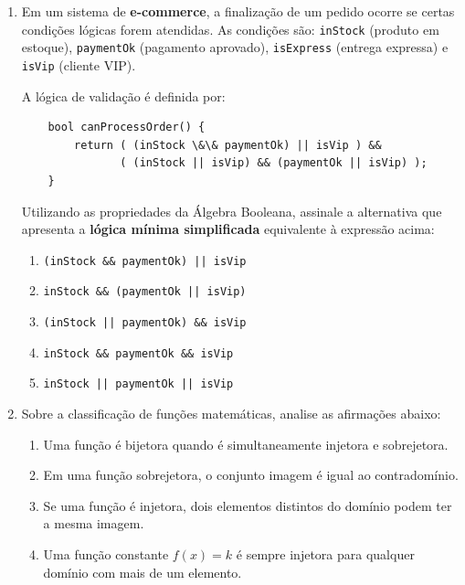 \documentclass[12pt,a4paper]{article}
\begin{document}
\begin{enumerate}
    \item Em um sistema de \textbf{e-commerce}, a finalização de um pedido ocorre se certas condições lógicas forem atendidas.
    As condições são: \texttt{inStock} (produto em estoque), \texttt{paymentOk} (pagamento aprovado), \texttt{isExpress} (entrega expressa) e \texttt{isVip} (cliente VIP).
    
    A lógica de validação é definida por:
    
    \begin{codeblock}
    \begin{verbatim}
    bool canProcessOrder() {
        return ( (inStock \&\& paymentOk) || isVip ) &&
               ( (inStock || isVip) && (paymentOk || isVip) );
    }
    \end{verbatim}
    \end{codeblock}

    Utilizando as propriedades da Álgebra Booleana, assinale a alternativa que apresenta a \textbf{lógica mínima simplificada} equivalente à expressão acima:

    \begin{enumerate}[label=\Alph*)]
        \item \texttt{(inStock \&\& paymentOk) || isVip}
        \item \texttt{inStock \&\& (paymentOk || isVip)}
        \item \texttt{(inStock || paymentOk) \&\& isVip}
        \item \texttt{inStock \&\& paymentOk \&\& isVip}
        \item \texttt{inStock || paymentOk || isVip}
    \end{enumerate}

    \item Sobre a classificação de funções matemáticas, analise as afirmações abaixo:
    
    \begin{enumerate}[label=\Roman*.]
        \item Uma função é bijetora quando é simultaneamente injetora e sobrejetora.
        \item Em uma função sobrejetora, o conjunto imagem é igual ao contradomínio.
        \item Se uma função é injetora, dois elementos distintos do domínio podem ter a mesma imagem.
        \item Uma função constante $f(x) = k$ é sempre injetora para qualquer domínio com mais de um elemento.
    \end{enumerate}


\end{enumerate}
\end{document}
